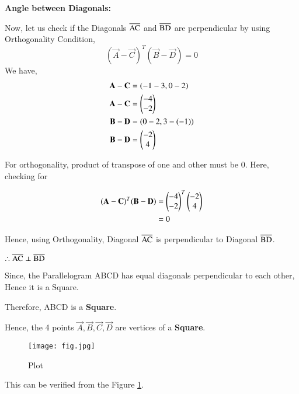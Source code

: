 \documentclass[journal,12pt,twocolumn]{IEEEtran}
\begin{document}
\textbf{Angle between Diagonals:}

Now, let us check if the Diagonals $\overline{\rm AC}$ and $\overline{\rm BD}$ are perpendicular by using Orthogonality Condition,
\begin{equation}
    (\vec{A} - \vec{C})^T(\vec{B} - \vec{D}) = 0
\end{equation}
We have,
\begin{align}
 \mathbf{A} - \mathbf{C} &= (-1-3, 0-2) \\
 \mathbf{A} - \mathbf{C} &= \begin{pmatrix}-4\\-2\end{pmatrix} \\
 \mathbf{B} - \mathbf{D} &= (0-2, 3-(-1)) \\
 \mathbf{B} - \mathbf{D} &= \begin{pmatrix}-2\\4\end{pmatrix}
\end{align}

For orthogonality, product of transpose of one and other must be 0. Here, checking for

\begin{align}
    (\mathbf{A} - \mathbf{C})^T(\mathbf{B} - \mathbf{D}) &= \begin{pmatrix}-4\\-2\end{pmatrix}^T\begin{pmatrix}-2\\4\end{pmatrix} \\
    &= 0
\end{align}

Hence, using Orthogonality, Diagonal $\overline{\rm AC}$ is perpendicular to Diagonal $\overline{\rm BD}$.

$\therefore \overline{\rm AC} \perp \overline{\rm BD}$

Since, the Parallelogram ABCD has equal diagonals perpendicular to each other, Hence it is a Square.

Therefore, ABCD is a \textbf{Square}.

Hence, the 4 points $\vec{A},\vec{B},\vec{C},\vec{D}$ are vertices of a \textbf{Square}. 

\begin{figure}[htp]
    \centering
    \texttt{[image: fig.jpg]}
    \caption{Plot}
    \label{fig:label}
\end{figure}
This can be verified from the Figure \ref{fig:label}.
\end{document}
